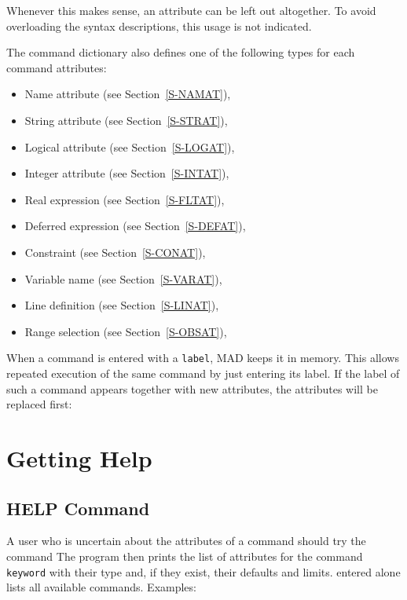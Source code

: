 Whenever this makes sense, an attribute can be left out altogether.
To avoid overloading the syntax descriptions,
this usage is not indicated.
 
The command dictionary also defines one of the following types
for each command attributes:
\begin{itemize}
\item Name attribute (see Section~\ref{S-NAMAT}),
\item String attribute (see Section~\ref{S-STRAT}),
\item Logical attribute (see Section~\ref{S-LOGAT}),
\item Integer attribute (see Section~\ref{S-INTAT}),
\item Real expression (see Section~\ref{S-FLTAT}),
\item Deferred expression (see Section~\ref{S-DEFAT}),
\item Constraint (see Section~\ref{S-CONAT}),
\item Variable name (see Section~\ref{S-VARAT}),
\item Line definition (see Section~\ref{S-LINAT}),
\item Range selection (see Section~\ref{S-OBSAT}),
\end{itemize}
When a command is entered with a {\tt label},
MAD keeps it in memory.
This allows repeated execution of the same command
by just entering its label.
If the label of such a command appears
together with new attributes,
the attributes will be replaced first:
 
\section{Getting Help}
\subsection{HELP Command}
\label{S-HELP}
A user who is uncertain about the attributes of a command
should try the  command
The program then prints the list of attributes for the command
{\tt keyword} with their type and,
if they exist, their defaults and limits.
 entered alone lists all available commands.
Examples:
 
